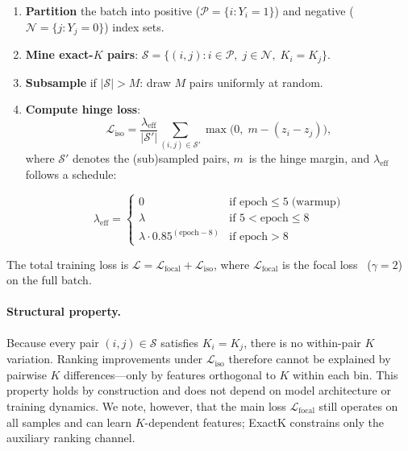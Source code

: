 \begin{enumerate}
\item \textbf{Partition} the batch into positive ($\mathcal{P} = \{i : Y_i = 1\}$) and negative ($\mathcal{N} = \{j : Y_j = 0\}$) index sets.
\item \textbf{Mine exact-$K$ pairs}: $\mathcal{S} = \{(i,j) : i \in \mathcal{P},\; j \in \mathcal{N},\; K_i = K_j\}$.
\item \textbf{Subsample} if $|\mathcal{S}| > M$: draw $M$ pairs uniformly at random.
\item \textbf{Compute hinge loss}:
\begin{equation}
\mathcal{L}_{\text{iso}} = \frac{\lambda_{\text{eff}}}{|\mathcal{S}'|} \sum_{(i,j) \in \mathcal{S}'} \max\!\bigl(0,\; m - (z_i - z_j)\bigr),
\end{equation}
where $\mathcal{S}'$ denotes the (sub)sampled pairs, $m$~is the hinge margin, and $\lambda_{\text{eff}}$ follows a schedule:
\begin{widetext}
\begin{equation}
\lambda_{\text{eff}} = \begin{cases} 0 & \text{if epoch} \leq 5 \;\text{(warmup)} \\ \lambda & \text{if } 5 < \text{epoch} \leq 8 \\ \lambda \cdot 0.85^{(\text{epoch} - 8)} & \text{if epoch} > 8 \end{cases}
\end{equation}
\end{widetext}
\end{enumerate}

The total training loss is $\mathcal{L} = \mathcal{L}_{\text{focal}} + \mathcal{L}_{\text{iso}}$, where $\mathcal{L}_{\text{focal}}$ is the focal loss~\cite{PLACEHOLDER_focal_loss} ($\gamma{=}2$) on the full batch.

\paragraph{Structural property.} Because every pair $(i,j) \in \mathcal{S}$ satisfies $K_i = K_j$, there is no within-pair $K$ variation. Ranking improvements under $\mathcal{L}_{\text{iso}}$ therefore cannot be explained by pairwise $K$ differences---only by features orthogonal to $K$ within each bin. This property holds by construction and does not depend on model architecture or training dynamics. We note, however, that the main loss $\mathcal{L}_{\text{focal}}$ still operates on all samples and can learn $K$-dependent features; ExactK constrains only the auxiliary ranking channel.

